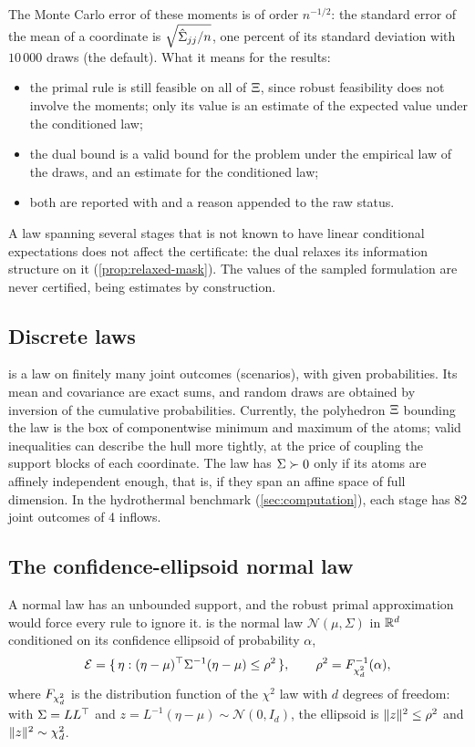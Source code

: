 The Monte Carlo error of these moments is of order $n^{-1/2}$:
the standard error of the mean of a coordinate is $\sqrt{\hat{\Sigma}_{jj}/n}$,
one percent of its standard deviation with $10\,000$ draws (the default).
What it means for the results:
\begin{itemize}[nosep]
\item the primal rule is still feasible on all of $\Xi$, since robust feasibility does not involve the moments;
only its value is an estimate of the expected value under the conditioned law;
\item the dual bound is a valid bound for the problem under the empirical law of the draws, and an estimate for the conditioned law;
\item both are reported with  and a reason appended to the raw status.
\end{itemize}
A law spanning several stages that is not known to have linear conditional expectations does not affect the certificate:
the dual relaxes its information structure on it (\cref{prop:relaxed-mask}).
The values of the sampled formulation are never certified, being estimates by construction.

\subsection{Discrete laws}

 is a law on finitely many joint outcomes (scenarios),
with given probabilities.
Its mean and covariance are exact sums,
and random draws are obtained by inversion of the cumulative probabilities.
Currently, the polyhedron $\Xi$ bounding the law
is the box of componentwise minimum and maximum of the atoms;
valid inequalities can describe the hull more tightly,
at the price of coupling the support blocks of each coordinate.
The law has $\Sigma \succ 0$ only if its atoms are affinely independent enough, that is, if they span an affine space of full dimension.
In the hydrothermal benchmark (\cref{sec:computation}), each stage has 82 joint outcomes of 4 inflows.

\subsection{The confidence-ellipsoid normal law}
\label{sec:confidence-normal}

A normal law has an unbounded support, and the robust primal approximation would force every rule to ignore it.
 is the normal law $\mathcal{N}(\mu, \Sigma)$ in $\mathbb{R}^d$ conditioned on its confidence ellipsoid of probability $\alpha$,
\[
\mathcal{E} = \{\, \eta : (\eta - \mu)^\top\Sigma^{-1}(\eta - \mu) \le \rho^2 \,\},
\qquad
\rho^2 = F_{\chi^2_{d}}^{-1}(\alpha),
\]
where $F_{\chi^2_{d}}$ is the distribution function of the $\chi^2$ law with $d$ degrees of freedom:
with $\Sigma = LL^\top$ and $z = L^{-1}(\eta - \mu) \sim \mathcal{N}(0, I_d)$, the ellipsoid is $\lVert z \rVert^2 \le \rho^2$ and $\lVert z \rVert^2 \sim \chi^2_d$.

